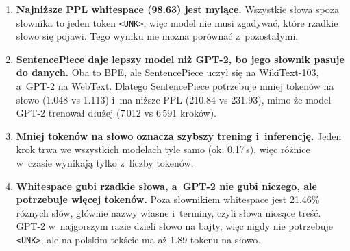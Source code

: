 \documentclass[11pt,a4paper]{article}
\begin{document}
\begin{enumerate}[leftmargin=*, itemsep=0.4em]
\item \textbf{Najniższe PPL whitespace (98.63) jest mylące.} Wszystkie słowa spoza słownika to jeden token \texttt{<UNK>}, więc model nie musi zgadywać, które rzadkie słowo się pojawi. Tego wyniku nie można porównać z~pozostałymi.

\item \textbf{SentencePiece daje lepszy model niż GPT-2, bo jego słownik pasuje do danych.} Oba to BPE, ale SentencePiece uczył się na WikiText-103, a~GPT-2 na WebText. Dlatego SentencePiece potrzebuje mniej tokenów na słowo (1.048 vs 1.113) i~ma niższe PPL (210.84 vs 231.93), mimo że model GPT-2 trenował dłużej (7\,012 vs 6\,591 kroków).

\item \textbf{Mniej tokenów na słowo oznacza szybszy trening i~inferencję.} Jeden krok trwa we wszystkich modelach tyle samo (ok. 0.17\,s), więc różnice w~czasie wynikają tylko z~liczby tokenów.

\item \textbf{Whitespace gubi rzadkie słowa, a~GPT-2 nie gubi niczego, ale potrzebuje więcej tokenów.} Poza słownikiem whitespace jest 21.46\% różnych słów, głównie nazwy własne i~terminy, czyli słowa niosące treść. GPT-2 w~najgorszym razie dzieli słowo na bajty, więc nigdy nie potrzebuje \texttt{<UNK>}, ale na polskim tekście ma aż 1.89 tokenu na słowo.
\end{enumerate}
\end{document}
